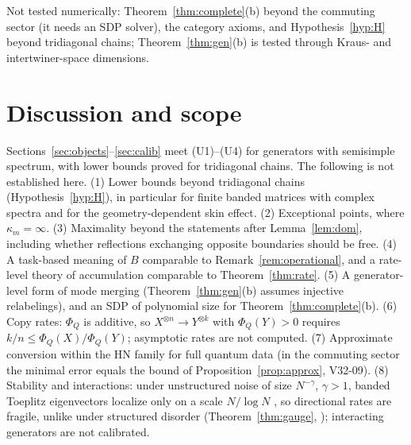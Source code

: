 \documentclass[11pt]{article}
\theoremstyle{definition}
\theoremstyle{remark}
\begin{document}
Not tested numerically: Theorem~\ref{thm:complete}(b) beyond the commuting sector (it needs an SDP solver), the category axioms, and Hypothesis~\ref{hyp:H} beyond tridiagonal chains; Theorem~\ref{thm:gen}(b) is tested through Kraus- and intertwiner-space dimensions.

\section{Discussion and scope}
\label{sec:disc}

Sections~\ref{sec:objects}--\ref{sec:calib} meet (U1)--(U4) for generators with semisimple spectrum, with lower bounds proved for tridiagonal chains. The following is not established here.
(1) Lower bounds beyond tridiagonal chains (Hypothesis~\ref{hyp:H}), in particular for finite banded matrices with complex spectra and for the geometry-dependent skin effect.
(2) Exceptional points, where $\kappa_m=\infty$.
(3) Maximality beyond the statements after Lemma~\ref{lem:dom}, including whether reflections exchanging opposite boundaries should be free.
(4) A task-based meaning of $B$ comparable to Remark~\ref{rem:operational}, and a rate-level theory of accumulation comparable to Theorem~\ref{thm:rate}.
(5) A generator-level form of mode merging (Theorem~\ref{thm:gen}(b) assumes injective relabelings), and an SDP of polynomial size for Theorem~\ref{thm:complete}(b).
(6) Copy rates: $\Phi_Q$ is additive, so $X^{\otimes n}\to Y^{\otimes k}$ with $\Phi_Q(Y)>0$ requires $k/n\le\Phi_Q(X)/\Phi_Q(Y)$; asymptotic rates are not computed.
(7) Approximate conversion within the HN family for full quantum data (in the commuting sector the minimal error equals the bound of Proposition~\ref{prop:approx}, V32-09).
(8) Stability and interactions: under unstructured noise of size $N^{-\gamma}$, $\gamma>1$, banded Toeplitz eigenvectors localize only on a scale $N/\log N$ \cite{BVZ23}, so directional rates are fragile, unlike under structured disorder (Theorem~\ref{thm:gauge}, \cite{ABDHL23}); interacting generators are not calibrated.
\end{document}
